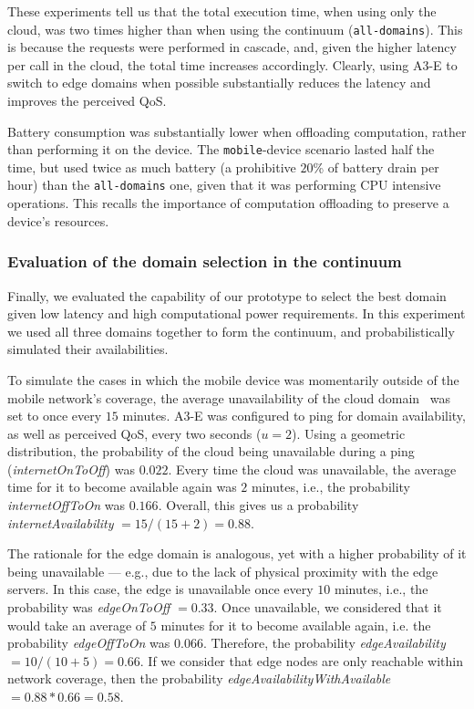 These experiments tell us that the total execution time, when using only the cloud, was two times higher than when using the continuum (\texttt{all-domains}). This is because the requests were performed in cascade, and, given the higher latency per call in the cloud, the total time increases accordingly. Clearly, using A3-E to switch to edge domains when possible substantially reduces the latency and improves the perceived QoS.

Battery consumption was substantially lower when offloading computation, rather than performing it on the device. The \texttt{mobile}-device scenario lasted half the time, but used twice as much battery (a prohibitive $20$\% of battery drain per hour) than the \texttt{all-domains} one, given that it was performing CPU intensive operations. This recalls the importance of computation offloading to preserve a device's resources.

\subsubsection{Evaluation of the domain selection in the continuum}

Finally, we evaluated the capability of our prototype to select the best domain given low latency and high computational power requirements. In this experiment we used all three domains together to form the continuum, and probabilistically simulated their availabilities. 

To simulate the cases in which the mobile device was momentarily outside of the mobile network's coverage, the average unavailability of the cloud domain~\cite{garcia2017bandwidth} was set to once every $15$ minutes. A3-E was configured to ping for domain availability, as well as perceived QoS, every two seconds ($u = 2$). Using a geometric distribution, the probability of the cloud being unavailable during a ping (\textit{internetOnToOff}) was $0.022$. Every time the cloud was unavailable, the average time for it to become available again was $2$ minutes, i.e., the probability  \textit{internetOffToOn} was $0.166$. Overall, this gives us a probability \textit{internetAvailability} $=15/(15+2)=0.88$.


The rationale for the edge domain is analogous, yet with a higher probability of it being unavailable --- e.g., due to the lack of physical proximity with the edge servers. In this case, the edge is unavailable once every $10$ minutes, i.e., the probability was \textit{edgeOnToOff}  $ = 0.33$. Once unavailable, we considered that it would take an average of $5$ minutes for it to become available again, i.e. the probability \textit{edgeOffToOn} was $0.066$. Therefore, the probability \textit{edgeAvailability} $=10/(10+5)=0.66$. If we consider that edge nodes are only reachable within network coverage, then the probability \textit{edgeAvailabilityWithAvailable}$=0.88*0.66=0.58$.

